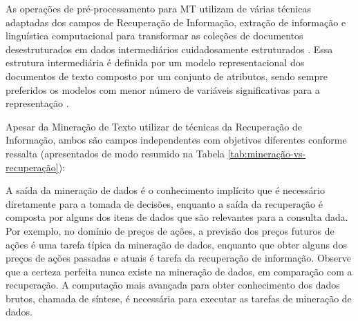     As operações de pré-processamento para MT utilizam de várias técnicas adaptadas dos campos de Recuperação de Informação, extração de informação e linguística computacional para transformar as coleções de documentos desestruturados em dados intermediários cuidadosamente estruturados \cite[p.~2--3]{Feldman:2006:TMH:1076381}. 
    Essa estrutura intermediária é definida por um modelo representacional dos documentos de texto composto por um conjunto de atributos, sendo sempre preferidos os modelos com menor número de variáveis significativas para a representação \cite[p.~4]{Feldman:2006:TMH:1076381}.
    
    Apesar da Mineração de Texto utilizar de técnicas da Recuperação de Informação, ambos são campos independentes com objetivos diferentes conforme ressalta  (apresentados de modo resumido na Tabela \ref{tab:mineração-vs-recuperação}):

    \begin{citacao}
        A saída da mineração de dados é o conhecimento implícito que é necessário diretamente para a tomada de decisões, enquanto a saída da recuperação é composta por alguns dos itens de dados que são relevantes para a consulta dada. 
        Por exemplo, no domínio de preços de ações, a previsão dos preços futuros de ações é uma tarefa típica da mineração de dados, enquanto que obter alguns dos preços de ações passadas e atuais é tarefa da recuperação de informação. 
        Observe que a certeza perfeita nunca existe na mineração de dados, em comparação com a recuperação. 
        A computação mais avançada para obter conhecimento dos dados brutos, chamada de síntese, é necessária para executar as tarefas de mineração de dados.
    \end{citacao}
    
    
    
